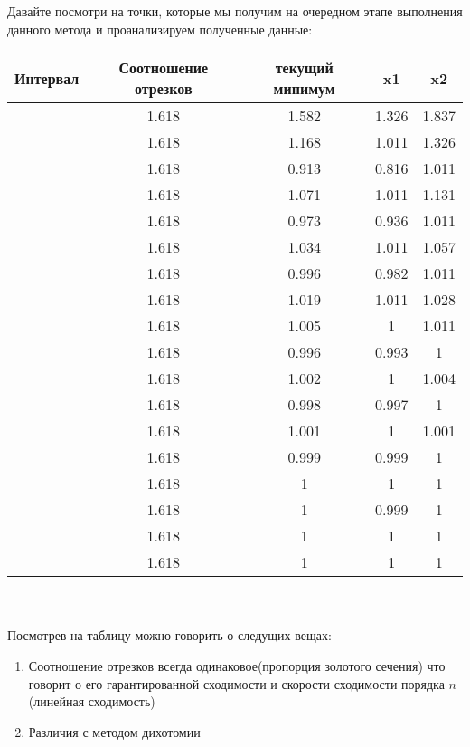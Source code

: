 \documentclass[a4paper, 14pt]{article}
\begin{document}
	Давайте посмотри на точки, которые мы получим на очередном этапе выполнения данного метода и проанализируем полученные данные:\\
	
	\begin{tabular}{|c |c| c| c| c|}
		\hline
		Интервал & Соотношение отрезков & текущий минимум & x1 & x2\\
		\hline
		[0.5, 2.663] & 1.618 & 1.582 & 1.326 & 1.837\\
\hline
[0.5, 1.837] & 1.618 & 1.168 & 1.011 & 1.326\\
\hline
[0.5, 1.326] & 1.618 & 0.913 & 0.816 & 1.011\\
\hline
[0.816, 1.326] & 1.618 & 1.071 & 1.011 & 1.131\\
\hline
[0.816, 1.131] & 1.618 & 0.973 & 0.936 & 1.011\\
\hline
[0.936, 1.131] & 1.618 & 1.034 & 1.011 & 1.057\\
\hline
[0.936, 1.057] & 1.618 & 0.996 & 0.982 & 1.011\\
\hline
[0.982, 1.057] & 1.618 & 1.019 & 1.011 & 1.028\\
\hline
[0.982, 1.028] & 1.618 & 1.005 & 1 & 1.011\\
\hline
[0.982, 1.011] & 1.618 & 0.996 & 0.993 & 1\\
\hline
[0.993, 1.011] & 1.618 & 1.002 & 1 & 1.004\\
\hline
[0.993, 1.004] & 1.618 & 0.998 & 0.997 & 1\\
\hline
[0.997, 1.004] & 1.618 & 1.001 & 1 & 1.001\\
\hline
[0.997, 1.001] & 1.618 & 0.999 & 0.999 & 1\\
\hline
[0.999, 1.001] & 1.618 & 1 & 1 & 1\\
\hline
[0.999, 1] & 1.618 & 1 & 0.999 & 1\\
\hline
[0.999, 1] & 1.618 & 1 & 1 & 1\\
\hline
[1, 1] & 1.618 & 1 & 1 & 1\\
\hline
	\end{tabular} \\\\
	Посмотрев на таблицу можно говорить о следущих вещах:
		\begin{enumerate}
		\item Соотношение отрезков всегда одинаковое(пропорция золотого сечения) что говорит о его гарантированной сходимости и скорости сходимости порядка $n$(линейная сходимость)
		\item Различия с методом дихотомии
		\end{enumerate}
		
\end{document}
